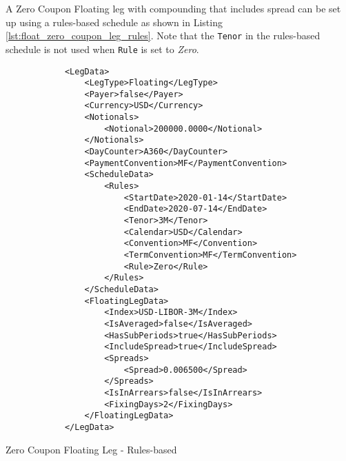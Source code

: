 \begin{itemize}
A Zero Coupon Floating leg with compounding that includes spread can be set up using a rules-based schedule as shown
in Listing \ref{lst:float_zero_coupon_leg_rules}. Note that the \lstinline!Tenor! in the rules-based schedule is not used when \lstinline!Rule! is set to \emph{Zero}.
\begin{listing}[H]
\begin{verbatim}
            <LegData>
                <LegType>Floating</LegType>
                <Payer>false</Payer>
                <Currency>USD</Currency>
                <Notionals>
                    <Notional>200000.0000</Notional>
                </Notionals>
                <DayCounter>A360</DayCounter>
                <PaymentConvention>MF</PaymentConvention>
                <ScheduleData>
                    <Rules>
                        <StartDate>2020-01-14</StartDate>
                        <EndDate>2020-07-14</EndDate>
                        <Tenor>3M</Tenor>
                        <Calendar>USD</Calendar>
                        <Convention>MF</Convention>
                        <TermConvention>MF</TermConvention>
                        <Rule>Zero</Rule>
                    </Rules>
                </ScheduleData>
                <FloatingLegData>
                    <Index>USD-LIBOR-3M</Index>
                    <IsAveraged>false</IsAveraged>
                    <HasSubPeriods>true</HasSubPeriods>
                    <IncludeSpread>true</IncludeSpread>
                    <Spreads>
                        <Spread>0.006500</Spread>
                    </Spreads>
                    <IsInArrears>false</IsInArrears>
                    <FixingDays>2</FixingDays>
                </FloatingLegData>
            </LegData>
\end{verbatim}
\caption{Zero Coupon Floating Leg - Rules-based}
\label{lst:float_zero_coupon_leg_rules}
\end{listing}


\end{itemize}
